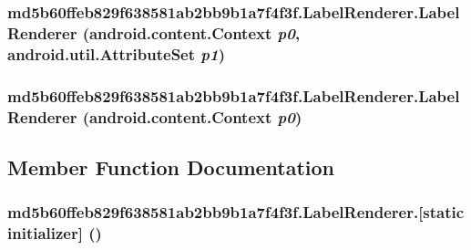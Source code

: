 \hypertarget{classmd5b60ffeb829f638581ab2bb9b1a7f4f3f_1_1_label_renderer_df11c884aea9ad69b88f2bc2c1c60b48}{
\subsubsection[{LabelRenderer}]{\setlength{\rightskip}{0pt plus 5cm}md5b60ffeb829f638581ab2bb9b1a7f4f3f.LabelRenderer.LabelRenderer (android.content.Context {\em p0}, \/  android.util.AttributeSet {\em p1})}}
\label{classmd5b60ffeb829f638581ab2bb9b1a7f4f3f_1_1_label_renderer_df11c884aea9ad69b88f2bc2c1c60b48}


\hypertarget{classmd5b60ffeb829f638581ab2bb9b1a7f4f3f_1_1_label_renderer_145238d242c95398df7762a0dee92f4c}{
\subsubsection[{LabelRenderer}]{\setlength{\rightskip}{0pt plus 5cm}md5b60ffeb829f638581ab2bb9b1a7f4f3f.LabelRenderer.LabelRenderer (android.content.Context {\em p0})}}
\label{classmd5b60ffeb829f638581ab2bb9b1a7f4f3f_1_1_label_renderer_145238d242c95398df7762a0dee92f4c}




\subsection{Member Function Documentation}
\hypertarget{classmd5b60ffeb829f638581ab2bb9b1a7f4f3f_1_1_label_renderer_af466d788901dafeebba7b0ebebc31a0}{
\subsubsection[{[static initializer]}]{\setlength{\rightskip}{0pt plus 5cm}md5b60ffeb829f638581ab2bb9b1a7f4f3f.LabelRenderer.\mbox{[}static initializer\mbox{]} ()}}
\label{classmd5b60ffeb829f638581ab2bb9b1a7f4f3f_1_1_label_renderer_af466d788901dafeebba7b0ebebc31a0}




